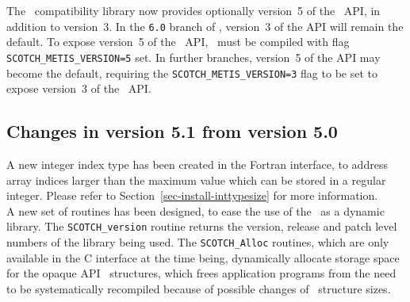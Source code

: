 The \metis\ compatibility library now provides optionally version~5 of
the \metis\ API, in addition to version~3. In the \texttt{6.0} branch
of \scotch, version~3 of the API will remain the default. To expose
version~5 of the \metis\ API, \scotch\ must be compiled with flag
\texttt{SCOTCH\_\lbt METIS\_\lbt VERSION=5} set. In further branches,
version~5 of the API may become the default, requiring the
\texttt{SCOTCH\_\lbt METIS\_\lbt VERSION=3} flag to be set to expose
version~3 of the \metis\ API.

\subsection{Changes in version 5.1 from version 5.0}

A new integer index type has been created in the Fortran interface, to
address array indices larger than the maximum value which can be
stored in a regular integer. Please refer to
Section~\ref{sec-install-inttypesize} for more information.
\\

A new set of routines has been designed, to ease the use of the
\libscotch\ as a dynamic library. The \texttt{SCOTCH\_\lbt version}
routine returns the version, release and patch level numbers of the
library being used. The \texttt{SCOTCH\_\lbt *Alloc} routines,
which are only available in the C interface at the time being,
dynamically allocate storage space for the opaque API
\scotch\ structures, which frees application programs from the need
to be systematically recompiled because of possible changes of
\scotch\ structure sizes.
